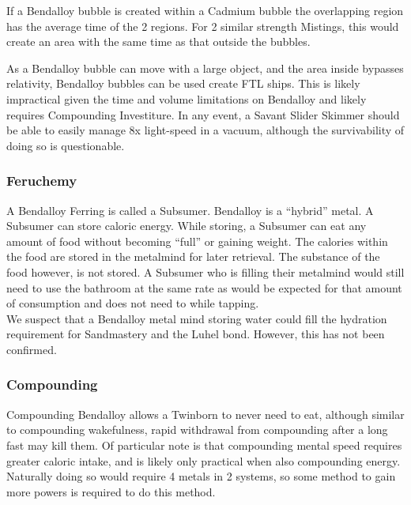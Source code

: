 \documentclass[conference]{IEEEtran}
\begin{document}
If a Bendalloy bubble is created within a Cadmium bubble the overlapping region has the average time of the 2 regions.  For 2 similar strength Mistings, this would create an area with the same time as that outside the bubbles.  \cite{AoL-CH12}

As a Bendalloy bubble can move with a large object,\cite{BoM-CH8} and the area inside bypasses relativity, Bendalloy bubbles can be used create FTL ships.  This is likely impractical given the time and volume limitations on Bendalloy and likely requires Compounding Investiture.
In any event, a Savant\cite{BoM-CH17} Slider Skimmer\cite{Massless} should be able to easily manage 8x light-speed in a vacuum, although the survivability of doing so is questionable.\\
\subsubsection*{\textbf{Feruchemy}}
A Bendalloy Ferring is called a Subsumer.\cite{ARS}  Bendalloy is a ``hybrid'' metal.\cite{FE-TB}  A Subsumer can store caloric energy.\cite{ARS}  While storing, a Subsumer can eat any amount of food without becoming ``full'' or gaining weight.  The calories within the food are stored in the metalmind for later retrieval.\cite{ARS}  The substance of the food however, is not stored.  A Subsumer who is filling their metalmind would still need to use the bathroom at the same rate as would be expected for that amount of consumption and does not need to while tapping.\cite{bathroom}\\

We suspect that a Bendalloy metal mind storing water could fill the hydration requirement for Sandmastery\cite{WS-CH1} and the Luhel bond\cite{ToES-CH31}.  However, this has not been confirmed.\\
\subsubsection*{\textbf{Compounding}}
Compounding Bendalloy allows a Twinborn to never need to eat, although similar to compounding wakefulness, rapid withdrawal from compounding after a long fast may kill them.\cite{TFE-CH38}\cite{AoL-CH13}  Of particular note is that compounding mental speed requires greater caloric intake, and is likely only practical when also compounding energy.  Naturally doing so would require 4 metals in 2 systems, so some method to gain more powers is required to do this method.\\
\end{document}
